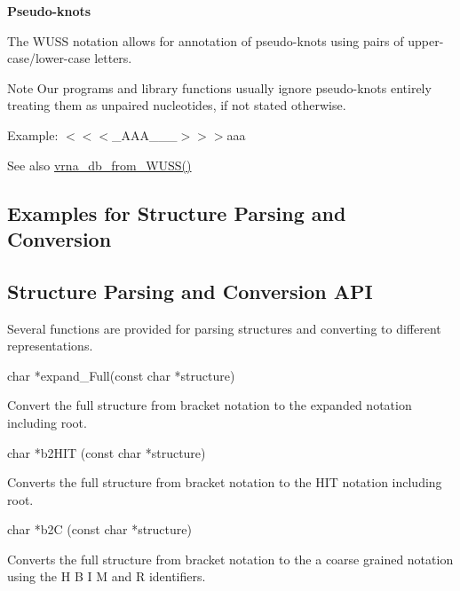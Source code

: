 \begin{DoxyItemize}
\item {\bfseries Pseudo-\/knots}

The W\+U\+SS notation allows for annotation of pseudo-\/knots using pairs of upper-\/case/lower-\/case letters. \begin{DoxyNote}{Note}
Our programs and library functions usually ignore pseudo-\/knots entirely treating them as unpaired nucleotides, if not stated otherwise.
\end{DoxyNote}
Example\+: {\ttfamily $<$$<$$<$\+\_\+\+A\+A\+A\+\_\+\+\_\+\+\_\+$>$$>$$>$aaa} 
\end{DoxyItemize}

\begin{DoxySeeAlso}{See also}
\mbox{\hyperlink{group__struct__utils_ga02ca70cffb2d864f7b2d95d92218bae0}{vrna\+\_\+db\+\_\+from\+\_\+\+W\+U\+S\+S()}}
\end{DoxySeeAlso}
\hypertarget{rna_structure_notations_structure_notations_examples}{}\subsection{Examples for Structure Parsing and Conversion}\label{rna_structure_notations_structure_notations_examples}
\hypertarget{rna_structure_notations_structure_notations_api}{}\subsection{Structure Parsing and Conversion A\+PI}\label{rna_structure_notations_structure_notations_api}
Several functions are provided for parsing structures and converting to different representations.

\begin{DoxyVerb}char  *expand_Full(const char *structure)
\end{DoxyVerb}
 Convert the full structure from bracket notation to the expanded notation including root.

\begin{DoxyVerb}char *b2HIT (const char *structure)
\end{DoxyVerb}
 Converts the full structure from bracket notation to the H\+IT notation including root.

\begin{DoxyVerb}char *b2C (const char *structure)
\end{DoxyVerb}
 Converts the full structure from bracket notation to the a coarse grained notation using the \textquotesingle{}H\textquotesingle{} \textquotesingle{}B\textquotesingle{} \textquotesingle{}I\textquotesingle{} \textquotesingle{}M\textquotesingle{} and \textquotesingle{}R\textquotesingle{} identifiers.

